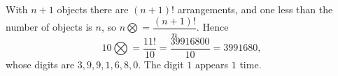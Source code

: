 With $n+1$ objects there are $(n+1)!$ arrangements, and one less than the number of objects is $n$, so $n\bigotimes=\dfrac{(n+1)!}{n}$. Hence
\[
10\bigotimes=\dfrac{11!}{10}=\dfrac{39916800}{10}=3991680 ,
\]
whose digits are $3,9,9,1,6,8,0$. The digit $1$ appears $\boxed{1}$ time.
